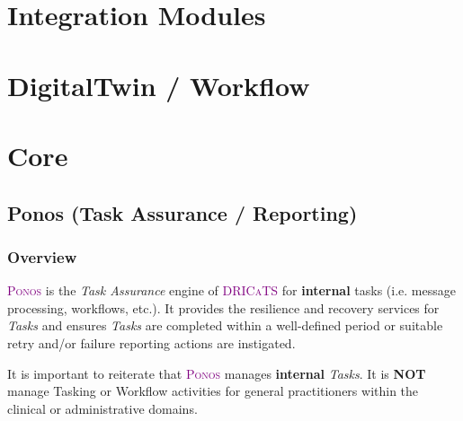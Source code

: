 \documentclass[a4paper]{book}
\newcommand{\dricats}{\textsc{\textcolor{Purple}{\small{DRICaTS }}}}
\newcommand{\ponos}{\textsc{\textcolor{Purple}{\small{Ponos }}}}
\begin{document}
\section{Integration Modules}

\section{DigitalTwin / Workflow}

\section{Core}
\subsection{Ponos (Task Assurance / Reporting)}
\subsubsection{Overview}

\ponos is the \textit{Task Assurance} engine of \dricats for \textbf{internal} tasks (i.e. message processing, workflows, etc.). It provides the resilience and recovery services for \textit{Tasks} and ensures \textit{Tasks} are completed within a well-defined period or suitable retry and/or failure reporting actions are instigated.

It is important to reiterate that \ponos manages \textbf{internal} \textit{Tasks}. It is \textbf{NOT} manage Tasking or Workflow activities for general practitioners within the clinical or administrative domains.
\end{document}

